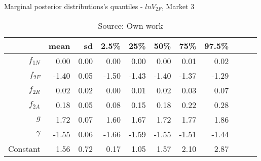 \begin{table}[H]
\caption{Marginal posterior distributions's quantiles - $ln V_{2F}$,  Market 3}
\centering
\begin{tabular}{rrrrrrrrrrr}
  \toprule
           & mean  & sd   & 2.5\% & 25\%  & 50\%  & 75\%  & 97.5\%\\ 
  \hline
  $f_{1N}$ & 0.00  & 0.00 & 0.00  & 0.00  & 0.00  & 0.01  & 0.02  \\ 
  $f_{2F}$ & -1.40 & 0.05 & -1.50 & -1.43 & -1.40 & -1.37 & -1.29 \\ 
  $f_{2R}$ & 0.02  & 0.02 & 0.00  & 0.01  & 0.02  & 0.03  & 0.07  \\ 
  $f_{2A}$ & 0.18  & 0.05 & 0.08  & 0.15  & 0.18  & 0.22  & 0.28  \\ 
  $g$      & 1.72  & 0.07 & 1.60  & 1.67  & 1.72  & 1.77  & 1.86  \\ 
  $\gamma$ & -1.55 & 0.06 & -1.66 & -1.59 & -1.55 & -1.51 & -1.44 \\ 
  Constant & 1.56  & 0.72 & 0.17  & 1.05  & 1.57  & 2.10  & 2.87  \\ 
     \bottomrule
\end{tabular}
\caption*{Source: Own work}
\end{table}
